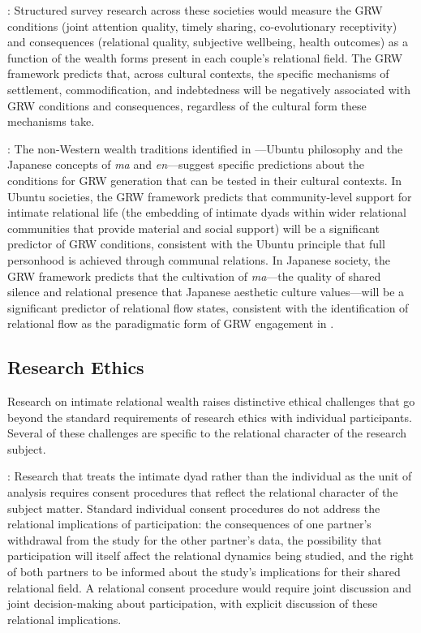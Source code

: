 : Structured survey research across these societies would measure the GRW conditions (joint attention quality, timely sharing, co-evolutionary receptivity) and consequences (relational quality, subjective wellbeing, health outcomes) as a function of the wealth forms present in each couple's relational field. The GRW framework predicts that, across cultural contexts, the specific mechanisms of settlement, commodification, and indebtedness will be negatively associated with GRW conditions and consequences, regardless of the cultural form these mechanisms take.

: The non-Western wealth traditions identified in ---Ubuntu philosophy and the Japanese concepts of \emph{ma} and \emph{en}---suggest specific predictions about the conditions for GRW generation that can be tested in their cultural contexts. In Ubuntu societies, the GRW framework predicts that community-level support for intimate relational life (the embedding of intimate dyads within wider relational communities that provide material and social support) will be a significant predictor of GRW conditions, consistent with the Ubuntu principle that full personhood is achieved through communal relations. In Japanese society, the GRW framework predicts that the cultivation of \emph{ma}---the quality of shared silence and relational presence that Japanese aesthetic culture values---will be a significant predictor of relational flow states, consistent with the identification of relational flow as the paradigmatic form of GRW engagement in  \parencite{paperxiv}.

\subsection{Research Ethics}
\label{p15:subsec:ethics}

\noindent
Research on intimate relational wealth raises distinctive ethical challenges that go beyond the standard requirements of research ethics with individual participants. Several of these challenges are specific to the relational character of the research subject.

: Research that treats the intimate dyad rather than the individual as the unit of analysis requires consent procedures that reflect the relational character of the subject matter. Standard individual consent procedures do not address the relational implications of participation: the consequences of one partner's withdrawal from the study for the other partner's data, the possibility that participation will itself affect the relational dynamics being studied, and the right of both partners to be informed about the study's implications for their shared relational field. A relational consent procedure would require joint discussion and joint decision-making about participation, with explicit discussion of these relational implications.

